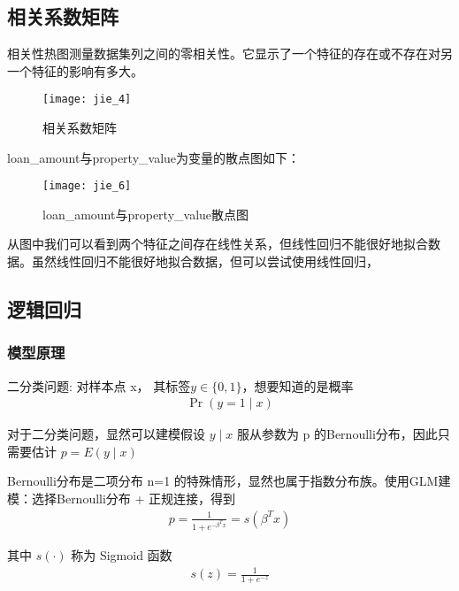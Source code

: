 \documentclass[withoutpreface,bwprint]{cumcmthesis} %
\begin{document}
\subsection{相关系数矩阵}
\par 相关性热图测量数据集列之间的零相关性。它显示了一个特征的存在或不存在对另一个特征的影响有多大。
\begin{figure}[H]
\centering
\centerline{\texttt{[image: jie\_4]}}  
\begin{center}
	\caption{相关系数矩阵}
\end{center}
\end{figure}

\par loan\_amount与property\_value为变量的散点图如下：
\begin{figure}[H]
	\centering
	\centerline{\texttt{[image: jie\_6]}}  
	\begin{center}
		\caption{loan\_amount与property\_value散点图}
	\end{center}
\end{figure}
\par 从图中我们可以看到两个特征之间存在线性关系，但线性回归不能很好地拟合数据。虽然线性回归不能很好地拟合数据，但可以尝试使用线性回归，

\subsection{逻辑回归}
\subsubsection{模型原理}
\par 二分类问题: 对样本点 x， 其标签$y \in\{0,1\} $，想要知道的是概率
\begin{align}
	\operatorname{Pr}(y=1 \mid x)
\end{align}
\par 对于二分类问题，显然可以建模假设  $y \mid x$  服从参数为  p  的Bernoulli分布，因此只需要估计 $ p=E(y \mid x) $

\par Bernoulli分布是二项分布  n=1  的特殊情形，显然也属于指数分布族。使用GLM建模：选择Bernoulli分布  +  正规连接，得到
\begin{align}
	p=\frac{1}{1+e^{-\beta^{T} x}}=s\left(\beta^{T} x\right)
\end{align}


\par 其中  $s(\cdot)$  称为 Sigmoid 函数
\begin{align}
	s(z)=\frac{1}{1+e^{-z}}
\end{align}
\end{document}
